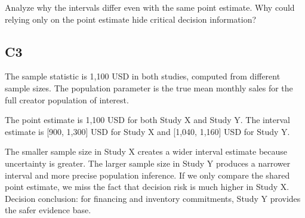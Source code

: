 \begin{ExamProblems}
		Analyze why the intervals differ even with the same point estimate.
		Why could relying only on the point estimate hide critical decision information?

		\subsection*{C3}
		The sample statistic is 1,100 USD in both studies, computed from different sample sizes.
		The population parameter is the true mean monthly sales for the full creator population of interest.

		The point estimate is 1,100 USD for both Study X and Study Y.
		The interval estimate is [900, 1,300] USD for Study X and [1,040, 1,160] USD for Study Y.

		The smaller sample size in Study X creates a wider interval estimate because uncertainty is greater.
		The larger sample size in Study Y produces a narrower interval and more precise population inference.
		If we only compare the shared point estimate, we miss the fact that decision risk is much higher in Study X.
		Decision conclusion: for financing and inventory commitments, Study Y provides the safer evidence base.

	\end{ExamProblems}

